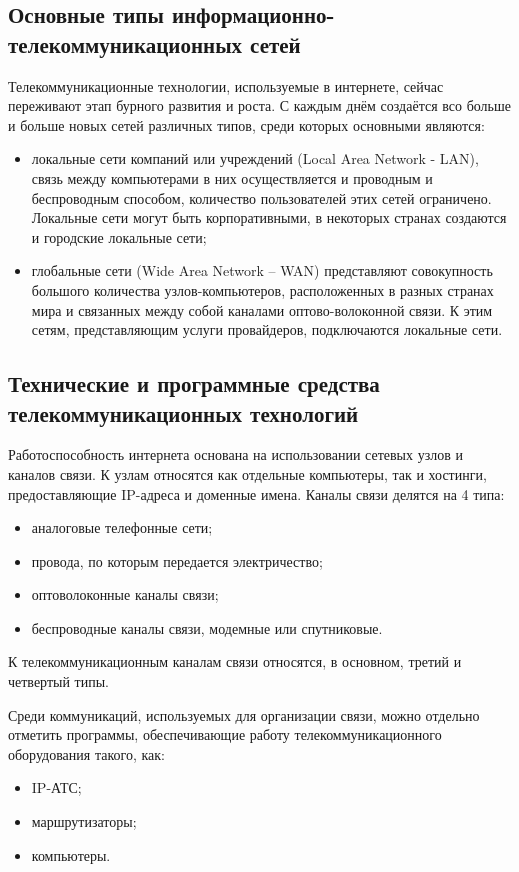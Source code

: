 \documentclass[a4paper]{report}
\begin{document}
\subsection{Основные типы информационно-телекоммуникационных сетей}
Телекоммуникационные технологии, используемые в интернете, сейчас переживают этап бурного развития и роста. С каждым днём создаётся всо больше и больше новых сетей различных типов, среди которых основными являются:
\begin{itemize}
\item локальные сети компаний или учреждений (Local Area Network - LAN), связь между компьютерами в них осуществляется и проводным и беспроводным способом, количество пользователей этих сетей ограничено. Локальные сети могут быть корпоративными, в некоторых странах создаются и городские локальные сети;
\item глобальные сети (Wide Area Network – WAN) представляют совокупность большого количества узлов-компьютеров, расположенных в разных странах мира и связанных между собой каналами оптово-волоконной связи. К этим сетям, представляющим услуги провайдеров, подключаются локальные сети.
\end{itemize}

\subsection{Технические и программные средства \\ телекоммуникационных технологий}
Работоспособность интернета основана на использовании сетевых узлов и каналов связи. К узлам относятся как отдельные компьютеры, так и хостинги, предоставляющие IP-адреса и доменные имена.
Каналы связи делятся на 4 типа:
\begin{itemize}
\item аналоговые телефонные сети;
\item провода, по которым передается электричество;
\item оптоволоконные каналы связи;
\item беспроводные каналы связи, модемные или спутниковые.
\end{itemize}
К телекоммуникационным каналам связи относятся, в основном, третий и четвертый типы.

Среди коммуникаций, используемых для организации связи, можно отдельно отметить программы, обеспечивающие работу телекоммуникационного оборудования такого, как:
\begin{itemize}
\item IP-АТС;
\item маршрутизаторы;
\item компьютеры.
\end{itemize}
\end{document}
